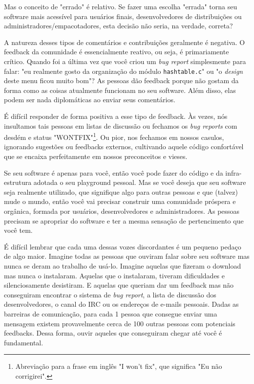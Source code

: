 Mas o conceito de "errado" é relativo. Se fazer uma escolha "errada" torna seu software mais
acessível para usuários finais, desenvolvedores de distribuições ou administradores/empacotadores,
esta decisão não seria, na verdade, correta?

A natureza desses tipos de comentários e contribuições geralmente é negativa.
O feedback da comunidade é essencialmente reativo, ou seja, é primariamente crítico.
Quando foi a última vez que você criou um \textit{bug report} simplesmente para falar: "eu realmente gosto da
organização do módulo \texttt{hashtable.c}" ou "o \textit{design} deste menu ficou muito bom"? 
As pessoas dão feedback porque não gostam da forma como as coisas 
atualmente funcionam no seu software. Além disso, elas podem ser nada diplomáticas ao enviar
seus comentários.

É difícil responder de forma positiva a esse tipo de feedback. Às vezes, nós insultamos
tais pessoas em listas de discussão ou fechamos os \textit{bug reports} 
com desdém e status "WONTFIX"\footnote{Abreviação para a frase em inglês "I won't fix", que
significa "Eu não corrigirei".}. Ou pior, nos fechamos em nossos casulos, ignorando sugestões
ou feedbacks externos, cultivando aquele código confortável que se encaixa perfeitamente
em nossos preconceitos e vieses.

Se seu software é apenas para você, então você pode fazer do código e da
infra-estrutura adotada o seu playground pessoal. Mas se você deseja que seu software 
seja realmente utilizado, que signifique algo para outras pessoas e que (talvez) mude o mundo,
então você vai precisar construir uma comunidade próspera e orgânica,
formada por usuários, desenvolvedores e administradores. 
As pessoas precisam se apropriar do software e ter a mesma sensação de pertencimento que você tem.

É difícil lembrar que cada uma dessas vozes discordantes é um pequeno pedaço
de algo maior. Imagine todas as pessoas que ouviram falar sobre seu software mas
nunca se deram ao trabalho de usá-lo. Imagine aquelas que fizeram o download mas
nunca o instalaram. Aquelas que o instalaram, tiveram dificuldades e silenciosamente
desistiram. E aquelas que queriam dar um feedback mas não conseguiram
encontrar o sistema de \textit{bug report}, a lista de discussão dos desenvolvedores,
o canal do IRC ou os endereços de e-mails pessoais. Dadas as barreiras de comunicação,
para cada 1 pessoa que consegue enviar uma mensagem existem provavelmente cerca
de 100 outras pessoas com potenciais feedbacks. Dessa forma, ouvir aqueles que conseguiram
chegar até você é fundamental.

